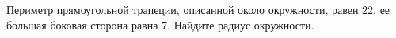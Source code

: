 \begin{ex}
	\begin{condition}
		Периметр прямоугольной трапеции, описанной около окружности, равен \( 22 \), ее большая боковая сторона равна \( 7 \). Найдите радиус окружности.
	\end{condition}
\end{ex}